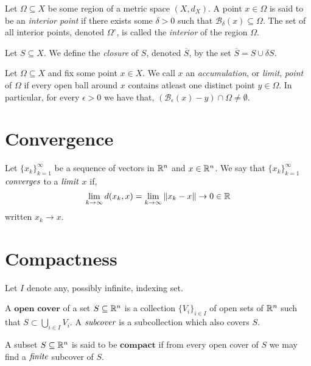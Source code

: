 \begin{defn}
  Let $\Omega \subseteq X$ be some region of a metric space $(X,d_X)$.
  A point $x \in \Omega$ is said to be an \emph{interior point} if
  there exists some $\delta>0$ such that $\mathcal{B}_{\delta}(x) \subseteq \Omega$.
  The set of all interior points, denoted $\Omega^{\circ}$,
  is called the \emph{interior} of the region $\Omega$.
\end{defn}

\begin{defn}[Closure]
  Let $S \subseteq X$. We define the \emph{closure} of $S$, denoted
  $\overline{S}$, by the set $\overline{S}=S \cup \delta S$.
\end{defn}

\begin{defn}
  Let $\Omega \subseteq X$ and fix some point $x \in X$. We call $x$
  an \emph{accumulation}, or \emph{limit}, \emph{point} of
  $\Omega$ if every open ball around $x$ contains atleast one distinct point
  $y \in \Omega$. In particular, for every $\epsilon > 0$ we have that,
  $(\mathcal{B}_{\epsilon}(x) - {y}) \cap \Omega \neq \emptyset$.
\end{defn}

\section{Convergence} %
\label{sec:convergence}

\begin{defn}[Limit]
	Let $\{x_k\}_{k=1}^{\infty}$ be a sequence of
	vectors in $\mathbb{R}^n$ and $x \in \mathbb{R}^n$. We say that
	$\{x_k\}_{k=1}^{\infty}$ $\emph{converges}$ to
	a $\emph{limit}$ $x$ if,
	\[
		\lim_{k \to \infty} d(x_k,x) =
		\lim_{k \to \infty} \| x_k - x \| \to 0 \in \mathbb{R}
	\]
	written $x_k \to x$.
\end{defn}

\section{Compactness} %
\label{sec:compactness}

Let $I$ denote any, possibly infinite, indexing set.

\begin{defn}
	A $\textbf{open cover}$ of a set $S \subseteq \mathbb{R}^n$
	is a collection $\{V_i\}_{i \in I}$ of open sets of
	$\mathbb{R}^n$ such that $S \subset \bigcup_{i \in I} V_i$.
	A $\emph{subcover}$ is a subcollection which also
	covers $S$.
\end{defn}

\begin{defn}[Compact]
	A subset $S \subseteq \mathbb{R}^n$ is said to be $\textbf{compact}$
	if from every open cover of $S$ we may find a $\emph{finite}$
	subcover of $S$.
\end{defn}
